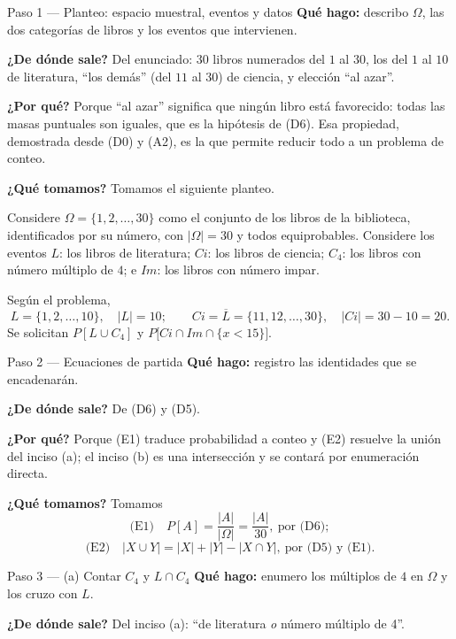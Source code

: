 \documentclass[11pt]{article}
\begin{document}
\begin{sol}

\begin{paso}{Paso 1 --- Planteo: espacio muestral, eventos y datos}
\textbf{Qué hago:} describo $\Omega$, las dos categorías de libros y los eventos que
intervienen.

\textbf{¿De dónde sale?} Del enunciado: $30$ libros numerados del $1$ al $30$, los del $1$ al
$10$ de literatura, ``los demás'' (del $11$ al $30$) de ciencia, y elección ``al azar''.

\textbf{¿Por qué?} Porque ``al azar'' significa que ningún libro está favorecido: todas las
masas puntuales son iguales, que es la hipótesis de (D6). Esa propiedad, demostrada desde (D0) y
(A2), es la que permite reducir todo a un problema de conteo.

\textbf{¿Qué tomamos?} Tomamos el siguiente planteo.

\medskip
Considere $\Omega=\{1,2,\dots,30\}$ como el conjunto de los libros de la biblioteca,
identificados por su número, con $|\Omega|=30$ y todos equiprobables. Considere los eventos
$L$: los libros de literatura; $Ci$: los libros de ciencia; $C_4$: los libros con número
múltiplo de $4$; e $Im$: los libros con número impar.

Según el problema,
\[
L=\{1,2,\dots,10\},\quad |L|=10;
\qquad
Ci=\overline{L}=\{11,12,\dots,30\},\quad |Ci|=30-10=20 .
\]
Se solicitan $P[L\cup C_4]$ y $P\big[Ci\cap Im\cap\{x<15\}\big]$.
\end{paso}

\begin{paso}{Paso 2 --- Ecuaciones de partida}
\textbf{Qué hago:} registro las identidades que se encadenarán.

\textbf{¿De dónde sale?} De (D6) y (D5).

\textbf{¿Por qué?} Porque (E1) traduce probabilidad a conteo y (E2) resuelve la unión del inciso
(a); el inciso (b) es una intersección y se contará por enumeración directa.

\textbf{¿Qué tomamos?} Tomamos
\[
\text{(E1)}\quad P[A]=\frac{|A|}{|\Omega|}=\frac{|A|}{30},\ \text{por (D6)};
\]
\[
\text{(E2)}\quad |X\cup Y|=|X|+|Y|-|X\cap Y|,\ \text{por (D5) y (E1)}.
\]
\end{paso}

\begin{paso}{Paso 3 --- (a) Contar $C_4$ y $L\cap C_4$}
\textbf{Qué hago:} enumero los múltiplos de $4$ en $\Omega$ y los cruzo con $L$.

\textbf{¿De dónde sale?} Del inciso (a): ``de literatura \emph{o} número múltiplo de 4''.


\end{paso}
\end{sol}
\end{document}
